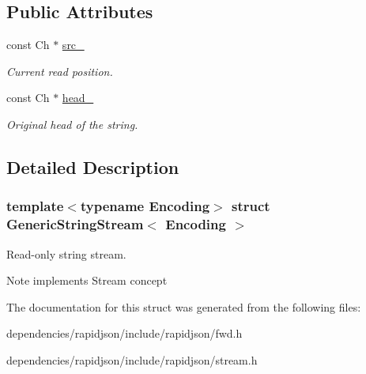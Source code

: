 \subsection*{Public Attributes}
\begin{DoxyCompactItemize}
\item 
\mbox{\label{struct_generic_string_stream_aeda813798e3f2d6bfdac86afc11b6b80}} 
const Ch $\ast$ \hyperlink{struct_generic_string_stream_aeda813798e3f2d6bfdac86afc11b6b80}{src\+\_\+}
\begin{DoxyCompactList}\small\item\em Current read position. \end{DoxyCompactList}\item 
\mbox{\label{struct_generic_string_stream_a3c86ef1e1f0655028cb8a3afce11ee4f}} 
const Ch $\ast$ \hyperlink{struct_generic_string_stream_a3c86ef1e1f0655028cb8a3afce11ee4f}{head\+\_\+}
\begin{DoxyCompactList}\small\item\em Original head of the string. \end{DoxyCompactList}\end{DoxyCompactItemize}


\subsection{Detailed Description}
\subsubsection*{template$<$typename Encoding$>$\newline
struct Generic\+String\+Stream$<$ Encoding $>$}

Read-\/only string stream. 

\begin{DoxyNote}{Note}
implements Stream concept 
\end{DoxyNote}


The documentation for this struct was generated from the following files\+:\begin{DoxyCompactItemize}
\item 
dependencies/rapidjson/include/rapidjson/fwd.\+h\item 
dependencies/rapidjson/include/rapidjson/stream.\+h\end{DoxyCompactItemize}
